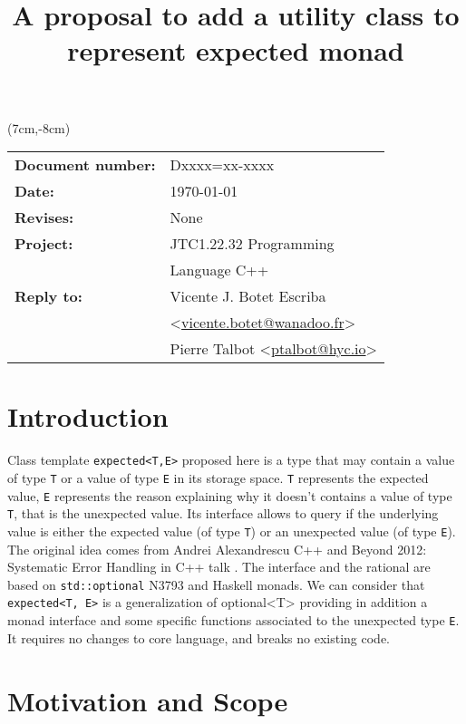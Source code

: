 \documentclass[a4paper,10pt]{article}
\title{A proposal to add a utility class to represent expected monad}
\author{}
\date{}
\newcommand{\cpp}[1]{\lstinline{#1}}
\begin{document}
\maketitle
\begin{textblock*}{9cm}(7cm,-8cm)
\begin{tabular}{l l}
\textbf{Document number:} & Dxxxx=xx-xxxx \\
\textbf{Date:}  & \today \\
\textbf{Revises:} & None \\
\textbf{Project:} & JTC1.22.32 Programming \\
 & Language C++ \\
\textbf{Reply to:} & Vicente J. Botet Escriba \\
 & <\href{mailto:vicente.botet@wanadoo.fr}{vicente.botet@wanadoo.fr}> \\
 & Pierre Talbot <\href{mailto:ptalbot@hyc.io}{ptalbot@hyc.io}>
\end{tabular}
\end{textblock*}

\vspace{-6em}
\setcounter{tocdepth}{1}
\tableofcontents

\section{Introduction}

Class template \cpp{expected<T,E>} proposed here is a type that may contain a value of type \cpp{T} or a value of type \cpp{E} in its storage space. \cpp{T} represents the expected value, \cpp{E} represents the reason explaining why it doesn't contains a value of type \cpp{T}, that is the unexpected value. Its interface allows to query if the underlying value is either the expected value (of type \cpp{T}) or an unexpected value (of type \cpp{E}). The original idea comes from Andrei Alexandrescu C++ and Beyond 2012: Systematic Error Handling in C++ talk \cite{AlexandrescuExpected}. The interface and the rational are based on \cpp{std::optional} N3793 \cite{OptionalRev5} and Haskell monads. We can consider that \cpp{expected<T, E>} is a generalization of optional<T> providing in addition a monad interface and some specific functions associated to the unexpected type \cpp{E}. It requires no changes to core language, and breaks no existing code.

\section{Motivation and Scope}
\label{motiv-scope}
\end{document}
